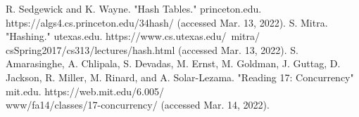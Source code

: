 \documentclass[conference]{IEEEtran}
\begin{document}
\begin{thebibliography}{00}
 R. Sedgewick and K. Wayne. "Hash Tables." princeton.edu. \\https://algs4.cs.princeton.edu/34hash/ (accessed Mar. 13, 2022).
 S. Mitra. "Hashing." utexas.edu. https://www.cs.utexas.edu/~mitra/\\csSpring2017/cs313/lectures/hash.html (accessed Mar. 13, 2022).
 S. Amarasinghe, A. Chlipala, S. Devadas, M. Ernst, M. Goldman, J. Guttag, D. Jackson, R. Miller, M. Rinard, and A. Solar-Lezama. "Reading 17: Concurrency"
mit.edu. https://web.mit.edu/6.005/\\www/fa14/classes/17-concurrency/ (accessed Mar. 14, 2022).
\end{thebibliography}
\end{document}
